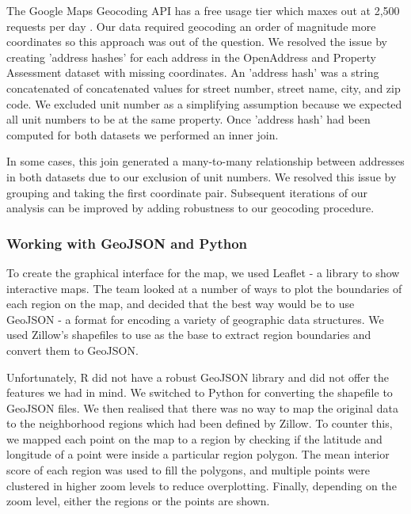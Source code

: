 \documentclass[12pt]{article}
\begin{document}
The Google Maps Geocoding API has a free usage tier which maxes out at
2,500 requests per day \cite{GettingS89:online}. Our data required
geocoding an order of magnitude more coordinates so this approach was
out of the question. We resolved the issue by creating 'address hashes'
for each address in the OpenAddress and Property Assessment dataset
with missing coordinates. An 'address hash' was a string concatenated
of concatenated values for street number, street name, city, and zip
code. We excluded unit number as a simplifying assumption because we
expected all unit numbers to be at the same property. Once 'address
hash' had been computed for both datasets we performed an inner join.

In some cases, this join generated a many-to-many relationship between
addresses in both datasets due to our exclusion of unit numbers. We
resolved this issue by grouping and taking the first coordinate pair.
Subsequent iterations of our analysis can be improved by adding
robustness to our geocoding procedure.

\subsubsection{Working with GeoJSON and Python}

To create the graphical interface for the map, we used Leaflet
\cite{Leafleta41:online,Leafletf18:online} - a library to show
interactive maps. The team looked at a number of ways to plot the
boundaries of each region on the map, and decided that the best way would
be to use GeoJSON \cite{RFC7946T67:online} - a format for encoding a
variety of geographic data structures. We used Zillow's shapefiles
\cite{ZillowNe81:online} to use as the base to extract region boundaries
and convert them to GeoJSON. 

Unfortunately, R did not have a robust GeoJSON library and did not 
offer the features we had in mind. We switched to Python for converting
the shapefile to GeoJSON files. We then realised that there was no way to
map the original data to the neighborhood regions which had been defined
by Zillow. To counter this, we mapped each point on the map to a region
by checking if the latitude and longitude of a point were inside a
particular region polygon. The mean interior score
of each region was used to fill the polygons, and multiple points were
clustered in higher zoom levels to reduce overplotting. Finally,
depending on the zoom level, either the regions or the points are shown.
\end{document}
